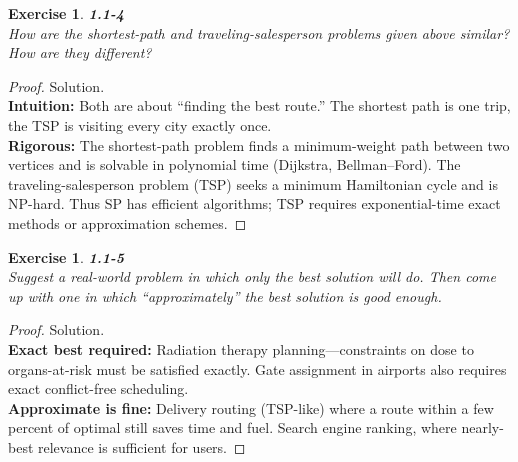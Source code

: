 \documentclass[12pt]{article}
\newtheorem{exercise}[theorem]{Exercise}
\theoremstyle{definition}
\begin{document}
\newpage

\begin{exercise}
\noindent
\textbf{1.1-4}\\
\noindent
How are the shortest-path and traveling-salesperson problems given above
similar? How are they different?
\end{exercise}

\vspace{1pt}

\begin{proof}
Solution.\\

\noindent
\textbf{Intuition:} Both are about “finding the best route.” The shortest path
is one trip, the TSP is visiting every city exactly once.\\

\noindent
\textbf{Rigorous:} The shortest-path problem finds a minimum-weight path
between two vertices and is solvable in polynomial time (Dijkstra,
Bellman–Ford). The traveling-salesperson problem (TSP) seeks a minimum
Hamiltonian cycle and is NP-hard. Thus SP has efficient algorithms;
TSP requires exponential-time exact methods or approximation schemes.
\end{proof}

\newpage

\begin{exercise}
\noindent
\textbf{1.1-5}\\
\noindent
Suggest a real-world problem in which only the best solution will do. Then
come up with one in which “approximately” the best solution is good
enough.
\end{exercise}

\vspace{1pt}

\begin{proof}
Solution.\\

\noindent
\textbf{Exact best required:} Radiation therapy planning—constraints on dose
to organs-at-risk must be satisfied exactly. Gate assignment in airports also
requires exact conflict-free scheduling.\\

\noindent
\textbf{Approximate is fine:} Delivery routing (TSP-like) where a route within
a few percent of optimal still saves time and fuel. Search engine ranking,
where nearly-best relevance is sufficient for users.
\end{proof}

\newpage
\end{document}
